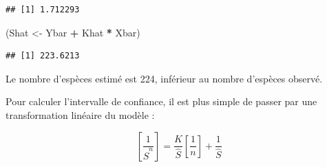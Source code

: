 \documentclass[
  11pt,
  french,
  a4paper,
  extrafontsizes,onecolumn,openright
  ]{memoir}
\newenvironment{Shaded}{\begin{snugshade}}{\end{snugshade}}
\newcommand{\CommentTok}[1]{\textcolor[rgb]{0.56,0.35,0.01}{\textit{#1}}}
\newcommand{\ControlFlowTok}[1]{\textcolor[rgb]{0.13,0.29,0.53}{\textbf{#1}}}
\newcommand{\DecValTok}[1]{\textcolor[rgb]{0.00,0.00,0.81}{#1}}
\newcommand{\FloatTok}[1]{\textcolor[rgb]{0.00,0.00,0.81}{#1}}
\newcommand{\KeywordTok}[1]{\textcolor[rgb]{0.13,0.29,0.53}{\textbf{#1}}}
\newcommand{\NormalTok}[1]{#1}
\newcommand{\OperatorTok}[1]{\textcolor[rgb]{0.81,0.36,0.00}{\textbf{#1}}}
\newcommand{\StringTok}[1]{\textcolor[rgb]{0.31,0.60,0.02}{#1}}
\begin{document}
\scriptsize

\begin{Shaded}
\end{Shaded}

\begin{verbatim}
## [1] 1.712293
\end{verbatim}

\begin{Shaded}
\begin{Highlighting}[]
\NormalTok{(Shat <-}\StringTok{ }\NormalTok{Ybar }\OperatorTok{+}\StringTok{ }\NormalTok{Khat }\OperatorTok{*}\StringTok{ }\NormalTok{Xbar)}
\end{Highlighting}
\end{Shaded}

\begin{verbatim}
## [1] 223.6213
\end{verbatim}

\normalsize

Le nombre d'espèces estimé est 224, inférieur au nombre d'espèces observé.

Pour calculer l'intervalle de confiance, il est plus simple de passer par une transformation linéaire du modèle \autocite{Lineweaver1934}:

\begin{equation}
  \label{eq:Lineweaver1934}
  \left[\frac{1}{\hat{S}^{n}}\right] = \frac{K}{\hat{S}}\left[\frac{1}{n}\right]+\frac{1}{\hat{S}} 
\end{equation}
\end{document}
